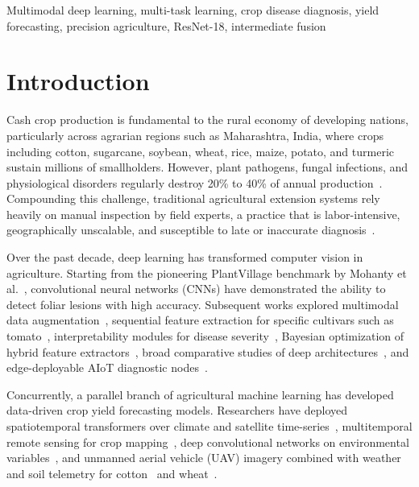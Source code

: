 \documentclass[conference]{IEEEtran}
\begin{document}
\begin{IEEEkeywords}
Multimodal deep learning, multi-task learning, crop disease diagnosis, yield forecasting, precision agriculture, ResNet-18, intermediate fusion
\end{IEEEkeywords}

\section{Introduction}

Cash crop production is fundamental to the rural economy of developing nations, particularly across agrarian regions such as Maharashtra, India, where crops including cotton, sugarcane, soybean, wheat, rice, maize, potato, and turmeric sustain millions of smallholders. However, plant pathogens, fungal infections, and physiological disorders regularly destroy 20\% to 40\% of annual production~\cite{mohanty2016}. Compounding this challenge, traditional agricultural extension systems rely heavily on manual inspection by field experts, a practice that is labor-intensive, geographically unscalable, and susceptible to late or inaccurate diagnosis~\cite{dolatabadian2025}. 

Over the past decade, deep learning has transformed computer vision in agriculture. Starting from the pioneering PlantVillage benchmark by Mohanty et al.~\cite{mohanty2016}, convolutional neural networks (CNNs) have demonstrated the ability to detect foliar lesions with high accuracy. Subsequent works explored multimodal data augmentation~\cite{zhang2024}, sequential feature extraction for specific cultivars such as tomato~\cite{almadhor2023}, interpretability modules for disease severity~\cite{zhu2025}, Bayesian optimization of hybrid feature extractors~\cite{khan2024}, broad comparative studies of deep architectures~\cite{ferentinos2018}, and edge-deployable AIoT diagnostic nodes~\cite{mukherjee2026}.

Concurrently, a parallel branch of agricultural machine learning has developed data-driven crop yield forecasting models. Researchers have deployed spatiotemporal transformers over climate and satellite time-series~\cite{sivasubramanian2026}, multitemporal remote sensing for crop mapping~\cite{tseng2023, gadiraju2020}, deep convolutional networks on environmental variables~\cite{nevavuori2019}, and unmanned aerial vehicle (UAV) imagery combined with weather and soil telemetry for cotton~\cite{feng2024, li2025} and wheat~\cite{cao2021}.
\end{document}
